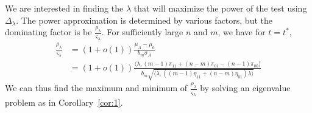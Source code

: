 \documentclass[final]{IEEEtran}
\theoremstyle{definition}
\begin{document}
We are interested in finding the $\lambda$ that will maximize the
power of the test using $\Delta_{\lambda}$. The power approximation is
determined by various factors, but the dominating factor is
be $\tfrac{\rho_\lambda}{\varsigma_\lambda}$. For sufficiently large $n$
and $m$, we have for $t = t^{*}$,
\begin{equation*}
  \begin{split}
  \frac{\rho_\lambda}{\varsigma_\lambda} &= (1 + o(1)) \frac{\mu_A - \mu_0}{b_m
    \sigma_A} \\ &= (1 + o(1)) \frac{\langle \lambda, (m-1)\pi_{11} + (n-m)\pi_{01} -
    (n-1) \pi_{00} \rangle}{b_m \sqrt{\langle \lambda, ((m-1) \eta_{11} +
    (n-m)\eta_{01}) \lambda \rangle}}
  \end{split}
\end{equation*}
We can thus find the maximum and minimum of
$\tfrac{\rho_{\lambda}}{\varsigma_{\lambda}}$ by solving an 
eigenvalue problem as in Corollary~\ref{cor:1}.
\end{document}
